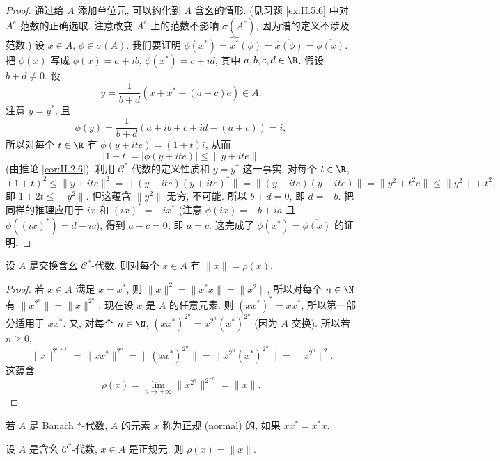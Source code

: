 \begin{proof}
通过给 $A$ 添加单位元, 可以约化到 $A$ 含幺的情形. (见习题 \ref{ex:II.5.6} 中对 $A^{\tilde{e}}$ 范数的正确选取. 注意改变 $A^{\tilde{e}}$ 上的范数不影响 $\sigma(A^{\tilde{e}})$, 因为谱的定义不涉及范数.)
设 $x \in A$, $\phi \in \sigma(A)$. 我们要证明 $\phi(x^*) = \widehat{x^*}(\phi) = \overline{\hat{x}(\phi)} = \overline{\phi(x)}$. 把 $\phi(x)$ 写成 $\phi(x) = a + ib$, $\phi(x^*) = c + id$, 其中 $a, b, c, d \in \R$.
假设 $b + d \neq 0$. 设
\[
y = \frac{1}{b + d}(x + x^* - (a + c)e) \in A.
\]
注意 $y = y^*$, 且
\[
\phi(y) = \frac{1}{b + d}(a + ib + c + id - (a + c)) = i,
\]
所以对每个 $t \in \R$ 有 $\phi(y + ite) = (1 + t)i$, 从而
\[
|1 + t| = |\phi(y + ite)| \leq \|y + ite\|
\]
(由推论 \ref{cor:II.2.6}). 利用 $\mathcal{C}^*$-代数的定义性质和 $y = y^*$ 这一事实, 对每个 $t \in \R$,
\[
(1 + t)^2 \leq \|y + ite\|^2 = \|(y + ite)(y + ite)^*\| = \|(y + ite)(y - ite)\| = \|y^2 + t^2e\| \leq \|y^2\| + t^2,
\]
即 $1 + 2t \leq \|y^2\|$. 但这蕴含 $\|y^2\|$ 无穷, 不可能. 所以 $b + d = 0$, 即 $d = -b$.
把同样的推理应用于 $ix$ 和 $(ix)^* = -ix^*$ (注意 $\phi(ix) = -b + ia$ 且 $\phi((ix)^*) = d - ic$), 得到 $a - c = 0$, 即 $a = c$. 这完成了 $\phi(x^*) = \overline{\phi(x)}$ 的证明.
\end{proof}

\begin{proposition}[自伴元的范数等于谱半径]
\label{prop:II.3.7}
设 $A$ 是交换含幺 $\mathcal{C}^*$-代数. 则对每个 $x \in A$ 有 $\|x\| = \rho(x)$.
\end{proposition}

\begin{proof}
若 $x \in A$ 满足 $x = x^*$, 则 $\|x\|^2 = \|x^*x\| = \|x^2\|$, 所以对每个 $n \in \N$ 有 $\|x^{2^n}\| = \|x\|^{2^n}$.
现在设 $x$ 是 $A$ 的任意元素. 则 $(xx^*)^* = xx^*$, 所以第一部分适用于 $xx^*$. 又, 对每个 $n \in \N$, $(xx^*)^{2^n} = x^{2^n}(x^*)^{2^n}$ (因为 $A$ 交换). 所以若 $n \geq 0$,
\[
\|x\|^{2^{n+1}} = \|xx^*\|^{2^n} = \|(xx^*)^{2^n}\| = \|x^{2^n}(x^*)^{2^n}\| = \|x^{2^n}\|^2.
\]
这蕴含
\[
\rho(x) = \lim_{n \to +\infty}\|x^{2^n}\|^{2^{-n}} = \|x\|.
\]
\end{proof}

\begin{definition}
\label{def:II.3.8}
若 $A$ 是 Banach $*$-代数, $A$ 的元素 $x$ 称为正规 (normal) 的, 如果 $xx^* = x^*x$.
\end{definition}

\begin{corollary}[正规元的范数]
\label{cor:II.3.9}
设 $A$ 是含幺 $\mathcal{C}^*$-代数, $x \in A$ 是正规元. 则 $\rho(x) = \|x\|$.
\end{corollary}

